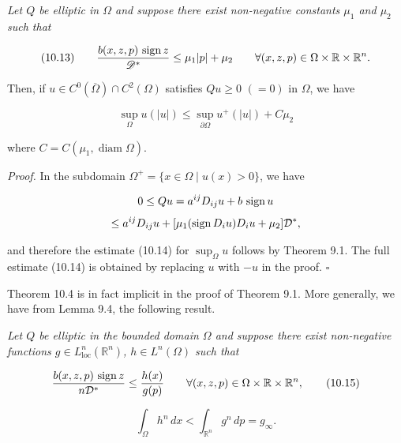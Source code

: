 \begin{theorem}\label{gilbarg-trudinger.thm.10.4.aleksandrov-type-bound}
\textit{Let $Q$ be elliptic in $\Omega$ and suppose there exist non-negative constants
$\mu_1$ and $\mu_2$ such that}

\[
\text{(10.13)}\qquad \frac{b(x,z,p)\,\operatorname{sign} z}{\mathscr{D}^*}\le \mu_1|p|+\mu_2
\qquad \forall (x,z,p)\in\Omega\times\mathbb{R}\times\mathbb{R}^n.
\]



Then, if $u \in C^0(\overline{\Omega}) \cap C^2(\Omega)$ satisfies $Qu \ge 0$ $(=0)$ in $\Omega$, we have

\begin{equation}
\sup_{\Omega} u(|u|) \le \sup_{\partial\Omega} u^+(|u|) + C\mu_2
\tag{10.14}
\end{equation}

where $C = C(\mu_1, \operatorname{diam}\Omega)$.

\textit{Proof.} In the subdomain $\Omega^+ = \{x \in \Omega \mid u(x) > 0\}$, we have

\[
0 \le Qu = a^{ij}D_{ij}u + b\,\operatorname{sign} u
\]
\[
\le a^{ij}D_{ij}u + [\mu_1(\operatorname{sign} D_i u)D_i u + \mu_2]\mathcal{D}^{*},
\]

and therefore the estimate (10.14) for $\sup_{\Omega} u$ follows by Theorem 9.1. The full
estimate (10.14) is obtained by replacing $u$ with $-u$ in the proof. $\square$

Theorem 10.4 is in fact implicit in the proof of Theorem 9.1. More generally, we
have from Lemma 9.4, the following result.

\begin{theorem}\label{gilbarg-trudinger.thm.10.5.integral-bound}
\textit{Let $Q$ be elliptic in the bounded domain $\Omega$ and suppose there exist
non-negative functions $g \in L^n_{\mathrm{loc}}(\mathbb{R}^n)$, $h \in L^n(\Omega)$ such that}

\begin{equation}
\frac{b(x,z,p)\,\operatorname{sign} z}{n\mathcal{D}^{*}} \le \frac{h(x)}{g(p)}
\qquad \forall (x,z,p) \in \Omega \times \mathbb{R} \times \mathbb{R}^n,
\tag{10.15}
\end{equation}

\begin{equation}
\int_{\Omega} h^n\,dx < \int_{\mathbb{R}^n} g^n\,dp = g_{\infty}.
\tag{10.16}
\end{equation}


\end{theorem}
\end{theorem}
